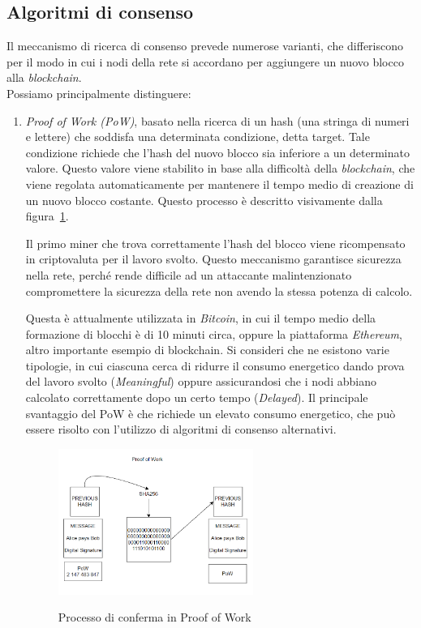 \subsection{Algoritmi di consenso}\label{sec:tecnologie-blockchain-algoritmi}
Il meccanismo di ricerca di consenso prevede numerose varianti, che differiscono per il modo in cui i nodi della rete si accordano per aggiungere un nuovo blocco alla \textit{blockchain}.\\
Possiamo principalmente distinguere:
\begin{enumerate}
    \item\textit{{Proof of Work (PoW)}}, basato nella ricerca di un hash (una stringa di numeri e lettere) che soddisfa una determinata condizione, detta target. Tale condizione richiede 
    che l'hash del nuovo blocco sia inferiore a un determinato valore. Questo valore viene stabilito in base alla difficoltà della \textit{blockchain}, che viene regolata automaticamente per mantenere 
    il tempo medio di creazione di un nuovo blocco costante. Questo processo è descritto visivamente dalla figura~\ref{fig:pow}.

    Il primo miner che trova correttamente l'hash del blocco viene ricompensato in criptovaluta per il lavoro svolto.
    Questo meccanismo garantisce sicurezza nella rete, perché rende difficile ad un attaccante malintenzionato
    compromettere la sicurezza della rete non avendo la stessa potenza di calcolo.
    
    Questa è attualmente utilizzata in \textit{Bitcoin}, in cui il tempo medio della formazione di blocchi è di 10 minuti circa, oppure la piattaforma \textit{Ethereum}, altro importante esempio di blockchain.
    Si consideri che ne esistono varie tipologie, in cui ciascuna cerca di ridurre il consumo energetico dando prova del lavoro svolto (\textit{Meaningful}) oppure assicurandosi che
    i nodi abbiano calcolato correttamente dopo un certo tempo (\textit{Delayed}).
    Il principale svantaggio del PoW è che richiede un elevato consumo energetico, che può essere risolto con l'utilizzo di algoritmi di consenso alternativi.

    \begin{figure}[ht]
        \centering
        \includegraphics[width=0.6\textwidth, alt={Come avviene il processo di conferma in Proof of Work}]{immagini/proof-of-work.png}
        \caption{Processo di conferma in Proof of Work}\label{fig:pow}
    \end{figure}


\end{enumerate}
